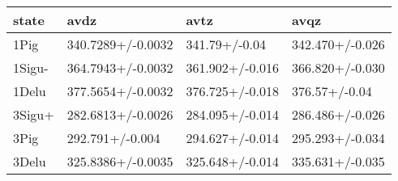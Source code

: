 \begin{tabular}{llll}
\toprule
state & avdz & avtz & avqz \\
\midrule
1Pig & 340.7289+/-0.0032 & 341.79+/-0.04 & 342.470+/-0.026 \\
1Sigu- & 364.7943+/-0.0032 & 361.902+/-0.016 & 366.820+/-0.030 \\
1Delu & 377.5654+/-0.0032 & 376.725+/-0.018 & 376.57+/-0.04 \\
3Sigu+ & 282.6813+/-0.0026 & 284.095+/-0.014 & 286.486+/-0.026 \\
3Pig & 292.791+/-0.004 & 294.627+/-0.014 & 295.293+/-0.034 \\
3Delu & 325.8386+/-0.0035 & 325.648+/-0.014 & 335.631+/-0.035 \\
\bottomrule
\end{tabular}
